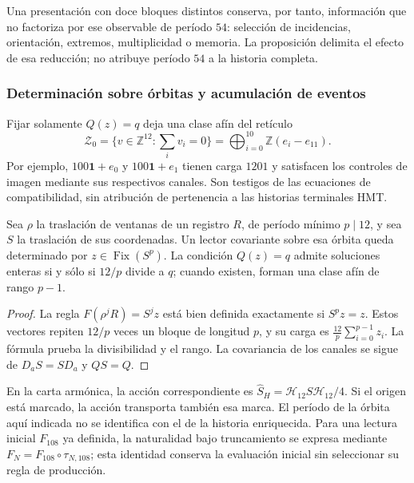 Una presentación con doce bloques distintos conserva, por tanto,
información que no factoriza por ese observable de período $54$:
selección de incidencias, orientación, extremos, multiplicidad o
memoria. La proposición delimita el efecto de esa reducción; no
atribuye período $54$ a la historia completa.

\subsubsection{Determinación sobre órbitas y acumulación de eventos}

Fijar solamente $Q(z)=q$ deja una clase afín del retículo
\[
 \mathcal Z_0=\{v\in\mathbb Z^{12}:\sum_i v_i=0\}
 =\bigoplus_{i=0}^{10}\mathbb Z(e_i-e_{11}).
\]
Por ejemplo, $100\mathbf1+e_0$ y $100\mathbf1+e_1$ tienen
carga $1201$ y satisfacen los controles de imagen mediante sus
respectivos canales. Son testigos de las ecuaciones de compatibilidad,
sin atribución de pertenencia a las historias terminales HMT.

\begin{proposition}
\label{iii:r25:covariancia}
Sea $\rho$ la traslación de ventanas de un registro $R$, de
período mínimo $p\mid12$, y sea $S$ la traslación de sus
coordenadas. Un lector covariante sobre esa órbita queda determinado
por $z\in\operatorname{Fix}(S^p)$. La condición $Q(z)=q$
admite soluciones enteras si y sólo si $12/p$ divide a $q$;
cuando existen, forman una clase afín de rango $p-1$.
\end{proposition}
\begin{proof}
La regla $F(\rho^jR)=S^jz$ está bien definida exactamente si
$S^pz=z$. Estos vectores repiten $12/p$ veces un bloque de
longitud $p$, y su carga es $\frac{12}{p}\sum_{i=0}^{p-1}z_i$.
La fórmula prueba la divisibilidad y el rango. La covariancia de
los canales se sigue de $D_aS=SD_a$ y $QS=Q$.
\end{proof}

En la carta armónica, la acción correspondiente es
$\widehat S_H=\mathcal H_{12}S\mathcal H_{12}/4$.
Si el origen está marcado, la acción transporta también esa marca.
El período de la órbita aquí indicada no se identifica con el de
la historia enriquecida. Para una lectura inicial $F_{108}$ ya
definida, la naturalidad bajo truncamiento se expresa mediante
$F_N=F_{108}\circ\tau_{N,108}$; esta identidad conserva la
evaluación inicial sin seleccionar su regla de producción.


